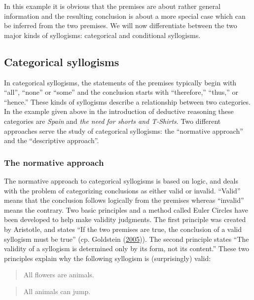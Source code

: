 \documentclass[
]{krantz}
\begin{document}
In this example it is obvious that the premises are about rather general information and the resulting conclusion is about a more special case which can be inferred from the two premises. We will now differentiate between the two major kinds of syllogisms: categorical and conditional syllogisms.

\hypertarget{categorical-syllogisms}{%
\subsection*{Categorical syllogisms}\label{categorical-syllogisms}}


In categorical syllogisms, the statements of the premises typically begin with ``all'', ``none'' or ``some'' and the conclusion starts with ``therefore,'' ``thus,'' or ``hence.'' These kinds of syllogisms describe a relationship between two categories. In the example given above in the introduction of deductive reasoning these categories are \emph{Spain} and \emph{the need for shorts and T-Shirts}. Two different approaches serve the study of categorical syllogisms: the ``normative approach'' and the ``descriptive approach''.

\hypertarget{the-normative-approach}{%
\subsubsection*{The normative approach}\label{the-normative-approach}}


The normative approach to categorical syllogisms is based on logic, and deals with the problem of categorizing conclusions as either valid or invalid. ``Valid'' means that the conclusion follows logically from the premises whereas ``invalid'' means the contrary. Two basic principles and a method called Euler Circles have been developed to help make validity judgments. The first principle was created by Aristotle, and states ``If the two premises are true, the conclusion of a valid syllogism must be true'' (cp. Goldstein (\protect\hyperlink{ref-Goldstein2005}{2005})). The second principle states ``The validity of a syllogism is determined only by its form, not its content.'' These two principles explain why the following syllogism is (surprisingly) valid:

\begin{quote}
All flowers are animals.
\end{quote}

\begin{quote}
All animals can jump.
\end{quote}
\end{document}
